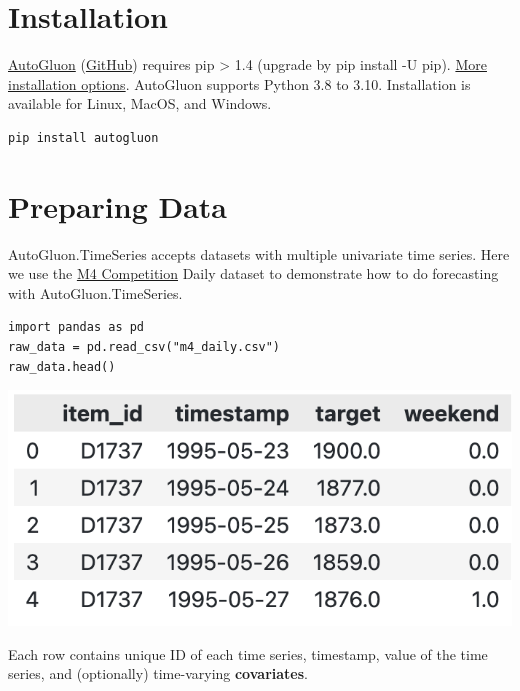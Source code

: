 \section*{Installation}
\href{https://auto.gluon.ai/stable/index.html}{AutoGluon} (\href{https://github.com/autogluon/autogluon/}{GitHub}) requires pip > 1.4 (upgrade by pip install -U pip). \href{https://auto.gluon.ai/stable/index.html#installation}{More installation options}. AutoGluon supports Python 3.8 to 3.10. Installation is available for Linux, MacOS, and Windows.

\begin{verbatim}
pip install autogluon 
\end{verbatim}


\section*{Preparing Data}

AutoGluon.TimeSeries accepts datasets with multiple univariate time series. Here we use the \href{https://www.sciencedirect.com/science/article/pii/S0169207019301128}{M4 Competition} Daily dataset to demonstrate how to do forecasting with AutoGluon.TimeSeries.

\begin{verbatim}
import pandas as pd
raw_data = pd.read_csv("m4_daily.csv")
raw_data.head()
\end{verbatim}

\begin{center}
\includegraphics[width=0.6\linewidth]{timeseries/images/raw_data.png}
\end{center}

\medskip

Each row contains unique ID of each time series, timestamp, value of the time series, and (optionally) time-varying \textbf{covariates}.

